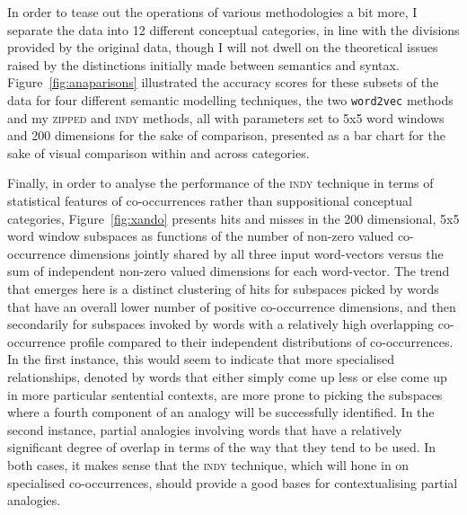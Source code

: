 In order to tease out the operations of various methodologies a bit more, I separate the data into 12 different conceptual categories, in line with the divisions provided by the original data, though I will not dwell on the theoretical issues raised by the distinctions initially made between semantics and syntax.  Figure~\ref{fig:anaparisons} illustrated the accuracy scores for these subsets of the data for four different semantic modelling techniques, the two \texttt{word2vec} methods and my \textsc{zipped} and \textsc{indy} methods, all with parameters set to 5x5 word windows and 200 dimensions for the sake of comparison, presented as a bar chart for the sake of visual comparison within and across categories.



Finally, in order to analyse the performance of the \textsc{indy} technique in terms of statistical features of co-occurrences rather than suppositional conceptual categories, Figure~\ref{fig:xando} presents hits and misses in the 200 dimensional, 5x5 word window subspaces as functions of the number of non-zero valued co-occurrence dimensions jointly shared by all three input word-vectors versus the sum of independent non-zero valued dimensions for each word-vector.  The trend that emerges here is a distinct clustering of hits for subspaces picked by words that have an overall lower number of positive co-occurrence dimensions, and then secondarily for subspaces invoked by words with a relatively high overlapping co-occurrence profile compared to their independent distributions of co-occurrences.  In the first instance, this would seem to indicate that more specialised relationships, denoted by words that either simply come up less or else come up in more particular sentential contexts, are more prone to picking the subspaces where a fourth component of an analogy will be successfully identified.  In the second instance, partial analogies involving words that have a relatively significant degree of overlap in terms of the way that they tend to be used.  In both cases, it makes sense that the \textsc{indy} technique, which will hone in on specialised co-occurrences, should provide a good bases for contextualising partial analogies.

